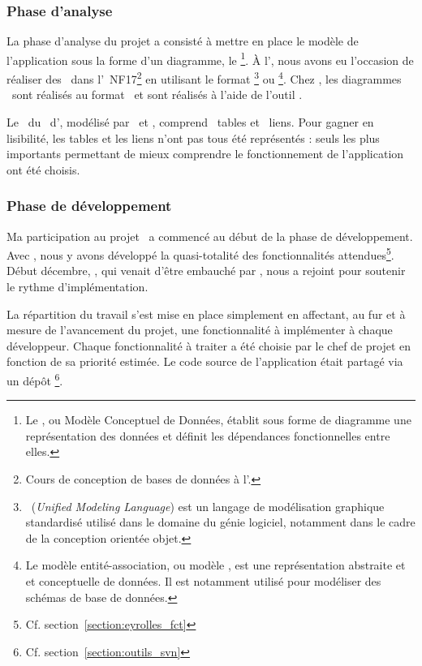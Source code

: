 \subsubsection{Phase d'analyse}

La phase d'analyse du projet a consisté à mettre en place le modèle de l'application sous la forme d'un diagramme, le \emph{\amcd}\footnote{Le \amcd, ou Modèle Conceptuel de Données, établit sous forme de diagramme une représentation des données et définit les dépendances fonctionnelles entre elles.}. À l'\autc, nous avons eu l'occasion de réaliser des \amcds\ dans l'\auv\ NF17\footnote{Cours de conception de bases de données à l'\autc.} en utilisant le format \auml\footnote{\auml\ (\textit{Unified Modeling Language}) est un langage de modélisation graphique standardisé utilisé dans le domaine du génie logiciel, notamment dans le cadre de la conception orientée objet.\cite{uml}} ou \aea\footnote{Le modèle entité-association, ou modèle \aea, est une représentation abstraite et et conceptuelle de données. Il est notamment utilisé pour modéliser des schémas de base de données.\cite{ea}}. Chez \asl, les diagrammes \amcds\ sont réalisés au format \aea\ et sont réalisés à l'aide de l'outil \amysqlwb.

Le \amcd\ du \alotdeux\ d'\aey, modélisé par \acohen\ et \ahamon, comprend ~tables et ~liens. Pour gagner en lisibilité, les tables et les liens n'ont pas tous été représentés : seuls les plus importants permettant de mieux comprendre le fonctionnement de l'application ont été choisis.


\subsubsection{Phase de développement}

Ma participation au projet \aey\ a commencé au début de la phase de développement. Avec \ahamon, nous y avons développé la quasi-totalité des fonctionnalités attendues\footnote{Cf. section~\ref{section:eyrolles_fct}}. Début décembre, \aweistroff, qui venait d'être embauché par \asl, nous a rejoint pour soutenir le rythme d'implémentation.

La répartition du travail s'est mise en place simplement en affectant, au fur et à mesure de l'avancement du projet, une fonctionnalité à implémenter à chaque développeur. Chaque fonctionnalité à traiter a été choisie par le chef de projet en fonction de sa priorité estimée. Le code source de l'application était partagé via un dépôt \asvn\footnote{Cf. section~\ref{section:outils_svn}}.

